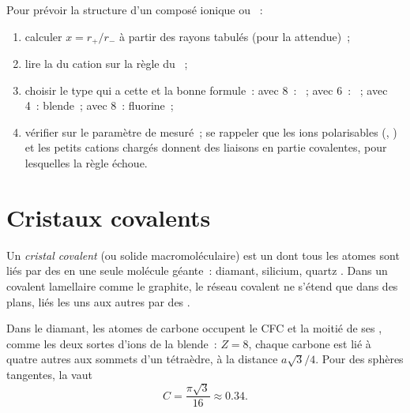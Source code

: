 \begin{method}\label{met:b1:crystals-ionic-covalent:predict}
Pour prévoir la structure d'un composé ionique  ou ~:
\begin{enumerate}
  \item calculer $x = r_+/r_-$ à partir des rayons tabulés (pour la
         attendue)~;
  \item lire la  du cation sur la règle du ~;
  \item choisir le type qui a cette  et la bonne formule~:
         avec 8~: ~; avec 6~: ~; avec 4~:
        blende~;  avec 8~: fluorine~;
  \item vérifier sur le paramètre de  mesuré~; se rappeler que les
        ions polarisables (, ) et les petits cations
        chargés donnent des liaisons en partie covalentes, pour
        lesquelles la règle échoue.
\end{enumerate}
\end{method}

\section{Cristaux covalents}

\begin{definition}\label{def:b1:crystals-ionic-covalent:covalent-crystal}
Un \emph{cristal covalent} (ou solide macromoléculaire) est un
 dont tous les atomes sont liés par des  en une
seule molécule géante~: diamant, silicium, quartz . Dans un
 covalent lamellaire comme le graphite, le réseau covalent ne
s'étend que dans des plans, liés les uns aux autres par des .
\end{definition}

\begin{proposition}\label{prop:b1:crystals-ionic-covalent:diamond}
Dans le diamant, les atomes de carbone occupent le  CFC et la
moitié de ses , comme les deux sortes d'ions de la
blende~: $Z = 8$, chaque carbone est lié à quatre autres aux sommets
d'un tétraèdre, à la distance $a\sqrt3/4$. Pour des sphères tangentes,
la  vaut
\[
  C = \frac{\pi\sqrt3}{16} \approx 0.34 .
\]
\end{proposition}

